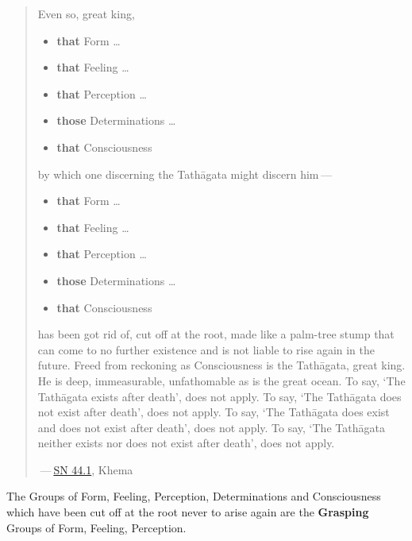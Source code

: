 \begin{quote}
Even so, great king,

\begin{itemize}
\item
  \textbf{that} Form \ldots\hspace{0pt}
\item
  \textbf{that} Feeling \ldots\hspace{0pt}
\item
  \textbf{that} Perception \ldots\hspace{0pt}
\item
  \textbf{those} Determinations \ldots\hspace{0pt}
\item
  \textbf{that} Consciousness
\end{itemize}

by which one discerning the Tathāgata might discern him --- 

\begin{itemize}
\item
  \textbf{that} Form \ldots\hspace{0pt}
\item
  \textbf{that} Feeling \ldots\hspace{0pt}
\item
  \textbf{that} Perception \ldots\hspace{0pt}
\item
  \textbf{those} Determinations \ldots\hspace{0pt}
\item
  \textbf{that} Consciousness
\end{itemize}

has been got rid of, cut off at the root, made like a palm-tree stump that can come to no further existence and is not liable to rise again in the future. Freed from reckoning as Consciousness is the Tathāgata, great king. He is deep, immeasurable, unfathomable as is the great ocean. To say, `The Tathāgata exists after death', does not apply. To say, `The Tathāgata does not exist after death', does not apply. To say, `The Tathāgata does exist and does not exist after death', does not apply. To say, `The Tathāgata neither exists nor does not exist after death', does not apply.

 --- \href{https://suttacentral.net/sn44.1/en/bodhi}{SN 44.1}, Khema
\end{quote}

The Groups of Form, Feeling, Perception, Determinations and Consciousness which have been cut off at the root never to arise again are the \textbf{Grasping} Groups of Form, Feeling, Perception.


